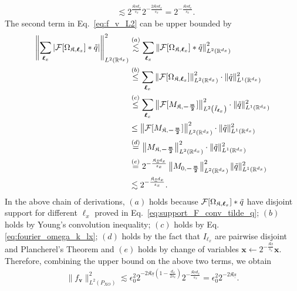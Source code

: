 \documentclass[11pt]{article}
\newcommand{\bx}{\mathbf x}
\newcommand{\bv}{\mathbf v}
\newcommand{\calF}{\mathcal{F}}
\newcommand{\bl}{{\boldsymbol\ell}}
\newcommand{\0}{\mathbf{0}}
\begin{document}
\begin{appendix}
\begin{align*}
    &\lesssim 2^{\frac{\mathfrak{K}\underline{s}d_x}{s_x}}2^{-\frac{2\mathfrak{K}\underline{s}d_x}{s_x}} = 2^{-\frac{\mathfrak{K}\underline{s}d_x}{s_x}}.
\end{align*}
The second term in Eq.~\eqref{eq:f_v_L2} can be upper bounded by
\begin{align*}
    \left\|\sum_{\bl_x} \left| \calF[\Omega_{\mathfrak{K},\bl_x}] \ast \Tilde{q} \right| \right\|^2_{L^2(\mathbb{R}^{d_x})} &\stackrel{(a)}{\lesssim} \sum_{\bl_x}\left\|\calF[\Omega_{\mathfrak{K},\bl_x}] \ast \Tilde{q} \right\|^2_{L^2(\mathbb{R}^{d_x})}\\ &\stackrel{(b)}{\leq} \sum_{\bl_x}\left\|\calF[\Omega_{\mathfrak{K},\bl_x}] \right\|^2_{L^2(\mathbb{R}^{d_x})} \cdot \|\Tilde{q}\|^2_{L^1(\mathbb{R}^{d_x})} \\
    &\stackrel{(c)}{\leq} \sum_{\bl_x}\left\|\calF[M_{\mathfrak{K},\boldsymbol{-\frac{\mathfrak{m}}{2}}}] \right\|^2_{L^2\left(\tilde{I}_{\bl_x}\right)} \cdot \|\Tilde{q}\|^2_{L^1(\mathbb{R}^{d_x})}\\ &\leq \left\|\calF[M_{\mathfrak{K},\boldsymbol{-\frac{\mathfrak{m}}{2}}}] \right\|^2_{L^2(\mathbb{R}^{d_x})} \cdot \|\Tilde{q}\|^2_{L^1(\mathbb{R}^{d_x})} \\
    &\stackrel{(d)}{=} \left\|M_{\mathfrak{K},\boldsymbol{-\frac{\mathfrak{m}}{2}}} \right\|^2_{L^2(\mathbb{R}^{d_x})} \cdot \|\Tilde{q}\|^2_{L^1(\mathbb{R}^{d_x})}\\ &\stackrel{(e)}{=} 2^{-\frac{\mathfrak{K}\underline{s}d_x}{s_x}} \left\|M_{0,\boldsymbol{-\frac{\mathfrak{m}}{2}}} \right\|^2_{L^2(\mathbb{R}^{d_x})} \|\Tilde{q}\|^2_{L^1(\mathbb{R}^{d_x})}\\
    &\lesssim 2^{-\frac{\mathfrak{K}\underline{s}d_x}{s_x}}. 
\end{align*}
In the above chain of derivations, $(a)$ holds because $\calF[\Omega_{\mathfrak{K},\bl_x}] \ast \Tilde{q}$ have disjoint support for different $\bl_x$ proved in Eq.~\eqref{eq:support_F_conv_tilde_q}; $(b)$ holds by Young’s convolution inequality; $(c)$ holds by Eq. \eqref{eq:fourier_omega_k_lx}; $(d)$ holds by the fact that $I_{\bl_x}$ are pairwise disjoint and Plancherel's Theorem and $(e)$ holds by change of variables $\bx\leftarrow 2^{-\frac{\mathfrak{K}\underline{s}}{s_x}}\bx$. 
Therefore, combining the upper bound on the above two terms, we obtain
\begin{align}
\label{eq:f_bv_l2}
    \|f_{\bv}\|^2_{L^2(P_{XO})} \lesssim \epsilon_0^2 2^{-2\mathfrak{K}\underline{s}\left(1 - \frac{d_x}{2s_x}\right)}  2^{-\frac{\mathfrak{K}\underline{s}d_x}{s_x}} = \epsilon_0^2 2^{-2\mathfrak{K}\underline{s}} .

\end{align}
\end{appendix}
\end{document}
